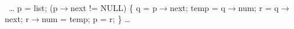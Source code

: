 {\tt
\begin{program}{0}
  \FL\ \ldots
   p = list;
   \WHILE (p$\rightarrow$next != NULL) \{
       q = p$\rightarrow$next;
       temp = q$\rightarrow$num;
       r = q$\rightarrow$next;
       r$\rightarrow$num = temp;
       p = r;
   \}
   \ldots
\end{program}
}